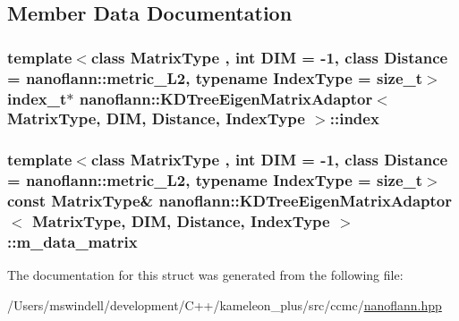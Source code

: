 \subsection{Member Data Documentation}
\hypertarget{structnanoflann_1_1_k_d_tree_eigen_matrix_adaptor_a171c13d72cca6020775ae1d15ea2f935}{
\subsubsection[{index}]{\setlength{\rightskip}{0pt plus 5cm}template$<$class Matrix\-Type , int D\-I\-M = -\/1, class Distance  = nanoflann\-::metric\-\_\-\-L2, typename Index\-Type  = size\-\_\-t$>$ {\bf index\-\_\-t}$\ast$ {\bf nanoflann\-::\-K\-D\-Tree\-Eigen\-Matrix\-Adaptor}$<$ Matrix\-Type, D\-I\-M, Distance, Index\-Type $>$\-::index}}\label{structnanoflann_1_1_k_d_tree_eigen_matrix_adaptor_a171c13d72cca6020775ae1d15ea2f935}
\hypertarget{structnanoflann_1_1_k_d_tree_eigen_matrix_adaptor_a003a066551cff2038b11efc66633d0f8}{
\subsubsection[{m\-\_\-data\-\_\-matrix}]{\setlength{\rightskip}{0pt plus 5cm}template$<$class Matrix\-Type , int D\-I\-M = -\/1, class Distance  = nanoflann\-::metric\-\_\-\-L2, typename Index\-Type  = size\-\_\-t$>$ const Matrix\-Type\& {\bf nanoflann\-::\-K\-D\-Tree\-Eigen\-Matrix\-Adaptor}$<$ Matrix\-Type, D\-I\-M, Distance, Index\-Type $>$\-::m\-\_\-data\-\_\-matrix}}\label{structnanoflann_1_1_k_d_tree_eigen_matrix_adaptor_a003a066551cff2038b11efc66633d0f8}


The documentation for this struct was generated from the following file\-:\begin{DoxyCompactItemize}
\item 
/\-Users/mswindell/development/\-C++/kameleon\-\_\-plus/src/ccmc/\hyperlink{nanoflann_8hpp}{nanoflann.\-hpp}\end{DoxyCompactItemize}
